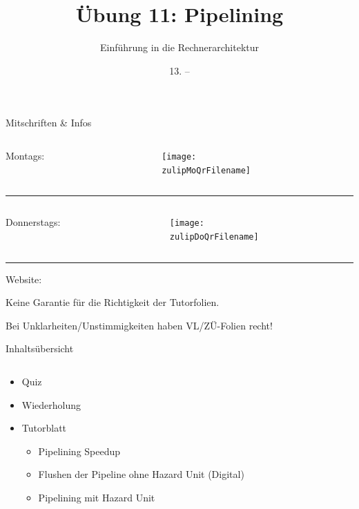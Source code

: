 \documentclass[
  german,            %
  aspectratio=169,    %
]{tumbeamer}
\title{Übung 11: Pipelining}
\subtitle{Einführung in die Rechnerarchitektur}
\author{\theAuthorName}
\institute{\theGroupName\\\theSchoolName\\\theUniversityName}
\date{13. -- \DTMdisplaydate{2025}{01}{19}{-1}}
\begin{document}
\maketitle

\begin{frame}[c]{Mitschriften \& Infos}{}
  \begin{minipage}[t]{\textwidth}
    \begin{columns}[c]
      \begin{column}{0.8\textwidth}
        Montags: \href{\zulipMo}{\zulipMo}
      \end{column}
      \begin{column}{0.2\textwidth}
        \texttt{[image: \\zulipMoQrFilename]}
      \end{column}
    \end{columns}
  \end{minipage}
  \rule{\textwidth}{0.4pt}
  \begin{minipage}[t]{\textwidth}
    \begin{columns}[c]
      \begin{column}{0.8\textwidth}
        Donnerstags: \href{\zulipDo}{\zulipDo}
      \end{column}
      \begin{column}{0.2\textwidth}
        \texttt{[image: \\zulipDoQrFilename]}
      \end{column}
    \end{columns}
  \end{minipage}
  \ifdefined\myWebsite
  \rule{\textwidth}{0.4pt}
  \centering
  Website: \href{\myWebsite}{\myWebsite}
  \fi
\end{frame}

\begin{frame}[c]{}{}
  \begin{center}
    \LARGE  Keine Garantie für die Richtigkeit der Tutorfolien.

    \Large Bei Unklarheiten/Unstimmigkeiten haben VL/ZÜ-Folien recht!
  \end{center}
\end{frame}

\begin{frame}[c]{Inhaltsübersicht}{}
  \begin{columns}[c]
    \begin{column}{1\textwidth}
      \begin{itemize}
        \item Quiz
        \item Wiederholung
        \item Tutorblatt
        \begin{itemize}
			\item Pipelining Speedup
			\item Flushen der Pipeline ohne Hazard Unit (Digital)
			\item Pipelining mit Hazard Unit
        \end{itemize}
      \end{itemize}
    \end{column}
  \end{columns}
\end{frame}
\end{document}
